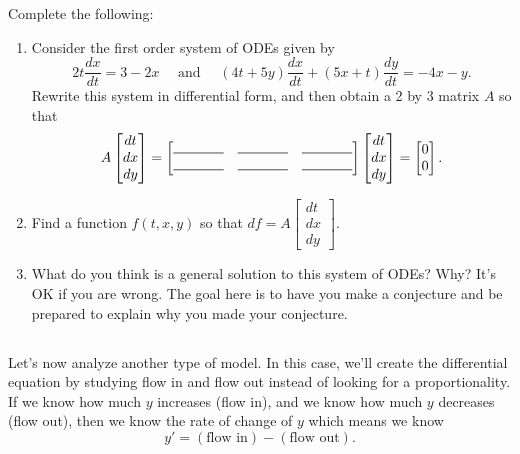 \begin{problem}
Complete the following:
\begin{enumerate}
 \item Consider the first order system of ODEs given by $$2t\frac{dx}{dt}=3-2x\quad\text{ and }\quad(4t+5y)\frac{dx}{dt}+(5x+t)\frac{dy}{dt}=-4x-y.$$
Rewrite this system in differential form, and then obtain a 2 by 3 matrix $A$ so that 
$$
A\begin{bmatrix}dt\\dx\\dy\end{bmatrix}
=
\begin{bmatrix}
\nvec{\rule{.5in}{.5pt} \\ \rule{.5in}{.5pt}}
&\nvec{\rule{.5in}{.5pt} \\ \rule{.5in}{.5pt}}
&\nvec{\rule{.5in}{.5pt} \\ \rule{.5in}{.5pt}}
\end{bmatrix}
\begin{bmatrix}dt\\dx\\dy\end{bmatrix}
=
\begin{bmatrix}0\\0\end{bmatrix}.$$    
 \item Find a function $f(t,x,y)$ so that 
$df = A\begin{bmatrix}dt\\dx\\dy\end{bmatrix}$. 
\item What do you think is a general solution to this system of ODEs? Why? It's OK if you are wrong. The goal here is to have you make a conjecture and be prepared to explain why you made your conjecture.
\end{enumerate}

\end{problem}


\subsection*{\ideaA}


%
Let's now analyze another type of model.  In this case, we'll create the differential equation by studying flow in and flow out instead of looking for a proportionality.  If we know how much $y$ increases (flow in), and we know how much $y$ decreases (flow out), then we know the rate of change of $y$ which means we know $$y' = (\text{flow in}) - (\text{flow out}).$$ 




